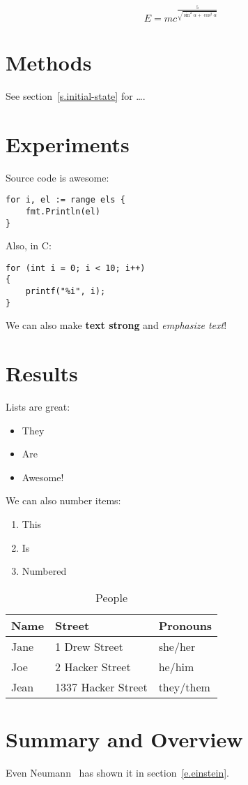 \documentclass{scrartcl}
\begin{document}
\begin{equation}
    E=mc^\frac{5}{\sqrt{\sin^2\alpha + \cos^2\alpha}}
\end{equation}

\section{Methods}

See section~\ref{s.initial-state} for \ldots.

\section{Experiments}

Source code is awesome:

\begin{verbatim}
for i, el := range els {
    fmt.Println(el)
}   
\end{verbatim}

Also, in C:

\begin{verbatim}
for (int i = 0; i < 10; i++)
{
    printf("%i", i);
}
\end{verbatim}

We can also make \textbf{text strong} and \emph{emphasize text}!

\section{Results}

Lists are great:

\begin{itemize}
    \item They
    \item Are
    \item Awesome!
\end{itemize}

We can also number items:

\begin{enumerate}
    \item This
    \item Is
    \item Numbered
\end{enumerate}

\begin{table}
    \caption{People}
    \centering
    \begin{tabular}[]{|l|l|l|}
        \hline
        \textbf{Name} & \textbf{Street}    & \textbf{Pronouns} \\\hline
        Jane          & 1 Drew Street      & she/her           \\\hline
        Joe           & 2 Hacker Street    & he/him            \\\hline
        Jean          & 1337 Hacker Street & they/them         \\\hline
    \end{tabular}
\end{table}

\section{Summary and Overview}

Even Neumann~\cite{Haines_Ruby_CFF_Library_2021} has shown it in section~\ref{e.einstein}.



\end{document}
